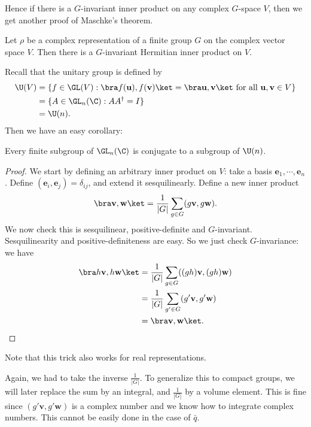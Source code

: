 \documentclass[a4paper]{article}
\begin{document}
Hence if there is a $G$-invariant inner product on any complex $G$-space $V$, then we get another proof of Maschke's theorem.
\begin{thm}
  Let $\rho$ be a complex representation of a finite group $G$ on the complex vector space $V$. Then there is a $G$-invariant Hermitian inner product on $V$.
\end{thm}

Recall that the unitary group is defined by
\begin{align*}
  \U(V) &= \{f \in \GL(V): \bra f(\mathbf{u}), f(\mathbf{v})\ket = \bra \mathbf{u}, \mathbf{v}\ket \text{ for all }\mathbf{u}, \mathbf{v} \in V\}\\
  &= \{A \in \GL_n(\C): AA^\dagger = I\}\\
  &= \U(n).
\end{align*}
Then we have an easy corollary:
\begin{cor}
  Every finite subgroup of $\GL_n(\C)$ is conjugate to a subgroup of $\U(n)$.
\end{cor}

\begin{proof}
  We start by defining an arbitrary inner product on $V$: take a basis $\mathbf{e}_1, \cdots, \mathbf{e}_n$. Define $(\mathbf{e}_i, \mathbf{e}_j) = \delta_{ij}$, and extend it sesquilinearly. Define a new inner product
  \[
    \bra \mathbf{v}, \mathbf{w}\ket = \frac{1}{|G|} \sum_{g \in G} (g\mathbf{v}, g\mathbf{w}).
  \]
  We now check this is sesquilinear, positive-definite and $G$-invariant. Sesquilinearity and positive-definiteness are easy. So we just check $G$-invariance: we have
  \begin{align*}
    \bra h\mathbf{v}, h\mathbf{w}\ket &= \frac{1}{|G|} \sum_{g \in G} ((gh)\mathbf{v}, (gh)\mathbf{w})\\
    &= \frac{1}{|G|} \sum_{g' \in G} (g' \mathbf{v}, g' \mathbf{w})\\
    &= \bra \mathbf{v}, \mathbf{w}\ket.
  \end{align*}
\end{proof}
Note that this trick also works for real representations.

Again, we had to take the inverse $\frac{1}{|G|}$. To generalize this to compact groups, we will later replace the sum by an integral, and $\frac{1}{|G|}$ by a volume element. This is fine since $(g' \mathbf{v}, g'\mathbf{w})$ is a complex number and we know how to integrate complex numbers. This cannot be easily done in the case of $\bar{q}$.
\end{document}
